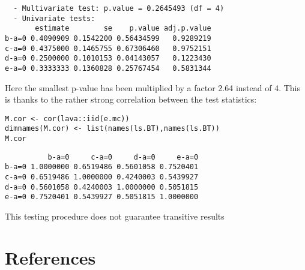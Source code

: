 \documentclass[12pt]{article}
\newcommand\Warning[1][3ex]{%
\renewcommand\stacktype{L}%
\scaleto{\stackon[1.3pt]{\color{red}$\triangle$}{\tiny\bfseries !}}{#1}%
\xspace
}
\begin{document}
\begin{verbatim}
  - Multivariate test: p.value = 0.2645493 (df = 4)
  - Univariate tests:
       estimate        se    p.value adj.p.value
b-a=0 0.4090909 0.1542200 0.56434599   0.9289219
c-a=0 0.4375000 0.1465755 0.67306460   0.9752151
d-a=0 0.2500000 0.1010153 0.04143057   0.1223430
e-a=0 0.3333333 0.1360828 0.25767454   0.5831344
\end{verbatim}



Here the smallest p-value has been multiplied by a factor 2.64 instead
of 4. This is thanks to the rather strong correlation between the test
statistics:
\lstset{language=r,label= ,caption= ,captionpos=b,numbers=none}
\begin{lstlisting}
M.cor <- cor(lava::iid(e.mc))
dimnames(M.cor) <- list(names(ls.BT),names(ls.BT))
M.cor
\end{lstlisting}

\begin{verbatim}
          b-a=0     c-a=0     d-a=0     e-a=0
b-a=0 1.0000000 0.6519486 0.5601058 0.7520401
c-a=0 0.6519486 1.0000000 0.4240003 0.5439927
d-a=0 0.5601058 0.4240003 1.0000000 0.5051815
e-a=0 0.7520401 0.5439927 0.5051815 1.0000000
\end{verbatim}


\Warning This testing procedure does not guarantee transitive results \citep{thangavelu2007wilcoxon}


\section*{References}
\label{sec:org4dfee00}
\begingroup
\renewcommand{\section}[2]{}




\endgroup
\end{document}
